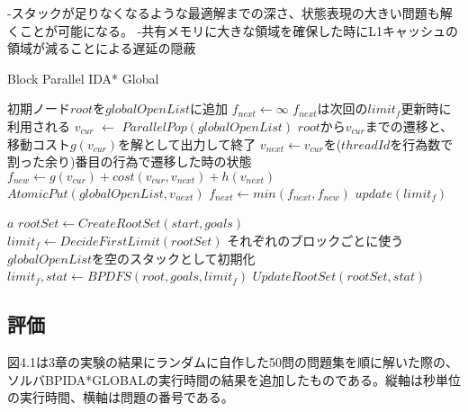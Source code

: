 \documentclass[a4paper,11pt,oneside,openany]{jsbook}
\begin{document}

-スタックが足りなくなるような最適解までの深さ、状態表現の大きい問題も解くことが可能になる。
-共有メモリに大きな領域を確保した時にL1キャッシュの領域が減ることによる遅延の隠蔽


\newpage
\begin{algorithm}
\caption{Block Parallel IDA* Global}
\label{alg:pbnf}
\begin{algorithmic}[1]
    \State 初期ノード$root$を$globalOpenList$に追加
    \State $f_{next} \leftarrow \infty$
    \State $f_{next}$は次回の$limit_f$更新時に利用される 
        \State $v_{cur}$ $\leftarrow$ ${ParallelPop}(globalOpenList)$
            \State $root$から$v_{cur}$までの遷移と、移動コスト$g(v_{cur})$を解として出力して終了
        \EndIf
        \State $v_{next} \gets $$v_{cur}$を($threadId$を行為数で割った余り)番目の行為で遷移した時の状態
        \State $f_{new} \leftarrow g(v_{cur}) + cost(v_{cur}, v_{next}) + h(v_{next})$
            \State ${AtomicPut}(globalOpenList, v_{next})$ 
        \Else
            \State $f_{next} \leftarrow min(f_{next}, f_{new})$
        \EndIf
    \EndWhile
    \State $update(limit_f)$

    \State \Return $a$
\EndFunction
{}
    \State $rootSet \gets {CreateRootSet}(start, goals)$
    \State $limit_f \leftarrow {DecideFirstLimit}(rootSet)$
    \State それぞれのブロックごとに使う$globalOpenList$を空のスタックとして初期化
            \State $limit_f, stat \gets {BPDFS}(root, goals, limit_f)$
        \EndParallelForByBlocks
        \State $UpdateRootSet(rootSet, stat)$
    \EndWhile
\EndFunction

\end{algorithmic}
\end{algorithm}
\newpage

\subsection{評価}
図4.1は3章の実験の結果にランダムに自作した50問の問題集を順に解いた際の、ソルバBPIDA*GLOBALの実行時間の結果を追加したものである。縦軸は秒単位の実行時間、横軸は問題の番号である。
\end{document}

